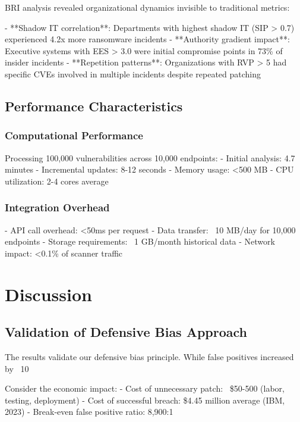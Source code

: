 \documentclass[11pt,a4paper]{article}
\begin{document}
BRI analysis revealed organizational dynamics invisible to traditional metrics:

- **Shadow IT correlation**: Departments with highest shadow IT (SIP > 0.7) experienced 4.2x more ransomware incidents
- **Authority gradient impact**: Executive systems with EES > 3.0 were initial compromise points in 73\% of insider incidents
- **Repetition patterns**: Organizations with RVP > 5 had specific CVEs involved in multiple incidents despite repeated patching

\subsection{Performance Characteristics}

\subsubsection{Computational Performance}

Processing 100,000 vulnerabilities across 10,000 endpoints:
- Initial analysis: 4.7 minutes
- Incremental updates: 8-12 seconds
- Memory usage: <500 MB
- CPU utilization: 2-4 cores average

\subsubsection{Integration Overhead}

- API call overhead: <50ms per request
- Data transfer: ~10 MB/day for 10,000 endpoints
- Storage requirements: ~1 GB/month historical data
- Network impact: <0.1\% of scanner traffic

\section{Discussion}

\subsection{Validation of Defensive Bias Approach}

The results validate our defensive bias principle. While false positives increased by ~10%

Consider the economic impact:
- Cost of unnecessary patch: ~\$50-500 (labor, testing, deployment)
- Cost of successful breach: \$4.45 million average (IBM, 2023)
- Break-even false positive ratio: 8,900:1
\end{document}
